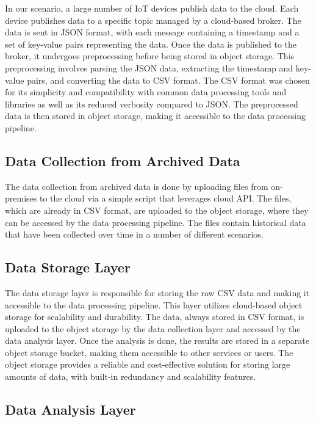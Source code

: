In our scenario, a large number of IoT devices publish data to the cloud. Each device publishes data to a specific topic managed by a cloud-based broker. The data is sent in JSON format, with each message containing a timestamp and a set of key-value pairs representing the data. Once the data is published to the broker, it undergoes preprocessing before being stored in object storage. This preprocessing involves parsing the JSON data, extracting the timestamp and key-value pairs, and converting the data to CSV format. The CSV format was chosen for its simplicity and compatibility with common data processing tools and libraries as well as its reduced verbosity compared to JSON. The preprocessed data is then stored in object storage, making it accessible to the data processing pipeline.


\subsection{Data Collection from Archived Data}
The data collection from archived data is done by uploading files from on-premises to the cloud via a simple script that leverages cloud API. The files, which are already in CSV format, are uploaded to the object storage, where they can be accessed by the data processing pipeline. The files contain historical data that have been collected over time in a number of different scenarios.

\subsection{Data Storage Layer}

The data storage layer is responsible for storing the raw CSV data and making it accessible to the data processing pipeline. This layer utilizes cloud-based object storage for scalability and durability. The data, always stored in CSV format, is uploaded to the object storage by the data collection layer and accessed by the data analysis layer.
Once the analysis is done, the results are stored in a separate object storage bucket, making them accessible to other services or users.
The object storage provides a reliable and cost-effective solution for storing large amounts of data, with built-in redundancy and scalability features.

\subsection{Data Analysis Layer}

